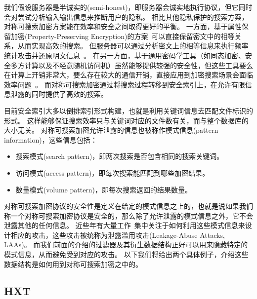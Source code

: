 我们假设服务器是半诚实的(semi-honest)，即服务器会诚实地执行协议，但它同时会对尝试分析输入输出信息来推断用户的隐私。
相比其他隐私保护的搜索方案，对称可搜索加密方案能在效率和安全之间取得更好的平衡。
一方面，基于属性保留加密(Property-Preserving Encryption)的方案~\cite{bellare2007deterministica}可以直接保留密文中的相等关系，从而实现高效的搜索。
但服务器可以通过分析密文上的相等信息来执行频率统计攻击并还原明文信息~\cite{naveed2015inferencea}。
在另一方面，基于通用密码学工具（如同态加密、安全多方计算以及不经意随机访问机）虽然能够提供较强的安全性，但这些工具要么在计算上开销非常大，要么存在较大的通信开销，直接应用到加密搜索场景会面临效率问题~\cite{ren2023searchable}。
而对称可搜索加密通过将搜索过程转移到安全索引上，在允许有限信息泄露的同时提供了高效的搜索。

目前安全索引大多以倒排索引形式构建，也就是利用关键词信息去匹配文件标识的形式。
这样能够保证搜索效率只与关键词对应的文件数有关，而与整个数据库的大小无关。
对称可搜索加密允许泄露的信息也被称作模式信息(pattern information)，这些信息包括：
\begin{itemize}
  \item 搜索模式(search pattern)，即两次搜索是否包含相同的搜索关键词。
  \item 访问模式(access pattern)，即每次搜索能匹配到哪些加密结果。
  \item 数量模式(volume pattern)，即每次搜索返回的结果数量。
\end{itemize}
对称可搜索加密协议的安全性是定义在给定的模式信息之上的，也就是说如果我们称一个对称可搜索加密协议是安全的，那么除了允许泄露的模式信息之外，它不会泄露其他的任何信息。
近些年有大量工作~\cite{cash2015leakageabuse,blackstone2020revisiting,ning2021leap,kamara2022sok}集中关注于如何利用这些模式信息来设计相应的攻击，这些攻击被统称为泄露滥用攻击(Leakage-Abuse Attacks, LAAs)。
而我们前面的介绍的过滤器及其衍生数据结构正好可以用来隐藏特定的模式信息，从而避免受到对应的攻击。
以下我们将给出两个具体例子，介绍这些数据结构是如何用到对称可搜索加密之中的。


\subsection{HXT}

